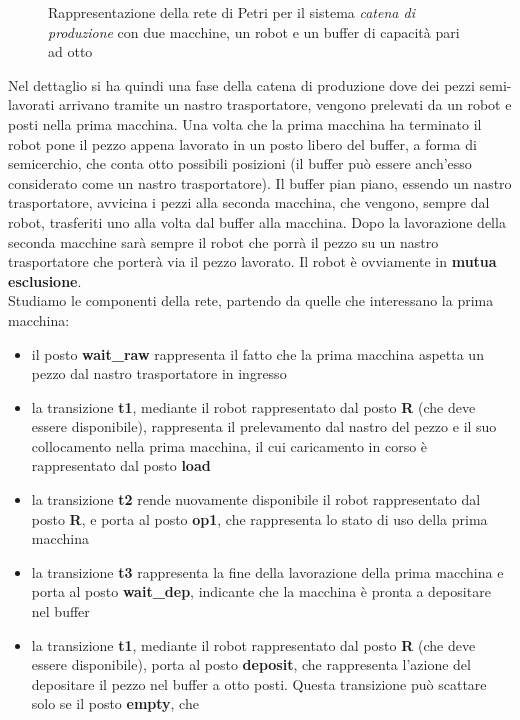 \documentclass[a4paper,12pt, oneside]{book}
\begin{document}
\begin{esempio}
\begin{figure}[H]
    \caption{Rappresentazione della rete di Petri per il sistema \emph{catena di
        produzione} con due macchine, un robot e un buffer di capacità pari ad
      otto}  
  \end{figure}
  Nel dettaglio si ha quindi una fase della catena di produzione dove dei pezzi
  semi-lavorati arrivano tramite un nastro trasportatore, vengono prelevati da
  un robot e posti nella prima macchina. Una volta che la prima macchina ha
  terminato il robot pone il pezzo appena lavorato in un posto libero del
  buffer, a forma di semicerchio, che conta otto possibili posizioni (il buffer
  può essere anch'esso considerato come un nastro trasportatore). Il buffer pian
  piano, essendo un nastro trasportatore, avvicina i pezzi alla seconda
  macchina, che vengono, sempre dal robot, trasferiti uno alla volta dal buffer
  alla macchina. Dopo la lavorazione della seconda macchine sarà sempre il robot
  che porrà il pezzo su un nastro trasportatore che porterà via il pezzo
  lavorato. Il robot è ovviamente in \textbf{mutua esclusione}.\\
  \newpage
  Studiamo le componenti della rete, partendo da quelle che interessano la prima
  macchina:
  \begin{itemize}
    \item il posto \textbf{wait\_raw} rappresenta il fatto che la prima macchina
    aspetta un pezzo dal nastro trasportatore in ingresso
    \item la transizione \textbf{t1}, mediante il robot rappresentato dal posto
    \textbf{R} (che deve essere disponibile), rappresenta il prelevamento dal
    nastro del pezzo e il suo collocamento nella prima macchina, il cui
    caricamento in corso è rappresentato dal posto \textbf{load} 
    \item la transizione \textbf{t2} rende nuovamente disponibile il robot
    rappresentato dal posto \textbf{R}, e porta al posto \textbf{op1}, che
    rappresenta lo stato di uso della prima macchina
    \item la transizione \textbf{t3} rappresenta la fine della lavorazione della
    prima macchina e porta al posto \textbf{wait\_dep}, indicante che la
    macchina è pronta a depositare nel buffer
    \item la transizione \textbf{t1}, mediante il robot rappresentato dal posto
    \textbf{R} (che deve essere disponibile), porta al posto \textbf{deposit},
    che rappresenta l'azione del depositare il pezzo nel buffer a otto
    posti. Questa transizione può scattare solo se il posto \textbf{empty}, che

\end{itemize}
\end{esempio}
\end{document}
